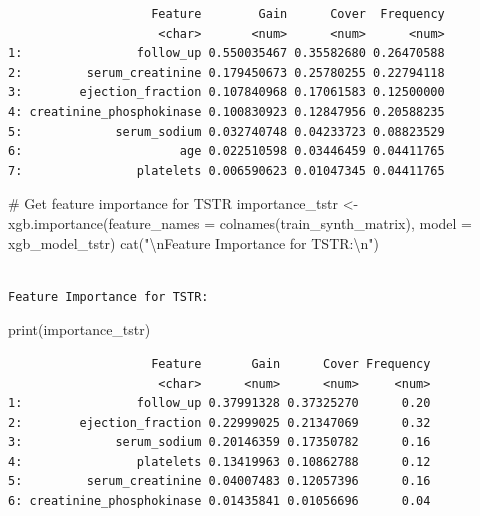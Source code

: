 \documentclass[
  letterpaper,
  DIV=11,
  numbers=noendperiod]{scrartcl}
\newenvironment{Shaded}{\begin{snugshade}}{\end{snugshade}}
\newcommand{\AttributeTok}[1]{\textcolor[rgb]{0.40,0.45,0.13}{#1}}
\newcommand{\CommentTok}[1]{\textcolor[rgb]{0.37,0.37,0.37}{#1}}
\newcommand{\FunctionTok}[1]{\textcolor[rgb]{0.28,0.35,0.67}{#1}}
\newcommand{\NormalTok}[1]{\textcolor[rgb]{0.00,0.23,0.31}{#1}}
\newcommand{\OtherTok}[1]{\textcolor[rgb]{0.00,0.23,0.31}{#1}}
\newcommand{\SpecialCharTok}[1]{\textcolor[rgb]{0.37,0.37,0.37}{#1}}
\newcommand{\StringTok}[1]{\textcolor[rgb]{0.13,0.47,0.30}{#1}}
\begin{document}
\begin{verbatim}
                    Feature        Gain      Cover  Frequency
                     <char>       <num>      <num>      <num>
1:                follow_up 0.550035467 0.35582680 0.26470588
2:         serum_creatinine 0.179450673 0.25780255 0.22794118
3:        ejection_fraction 0.107840968 0.17061583 0.12500000
4: creatinine_phosphokinase 0.100830923 0.12847956 0.20588235
5:             serum_sodium 0.032740748 0.04233723 0.08823529
6:                      age 0.022510598 0.03446459 0.04411765
7:                platelets 0.006590623 0.01047345 0.04411765
\end{verbatim}

\begin{Shaded}
\begin{Highlighting}[]
\CommentTok{\# Get feature importance for TSTR}
\NormalTok{importance\_tstr }\OtherTok{\textless{}{-}} \FunctionTok{xgb.importance}\NormalTok{(}\AttributeTok{feature\_names =} \FunctionTok{colnames}\NormalTok{(train\_synth\_matrix), }\AttributeTok{model =}\NormalTok{ xgb\_model\_tstr)}
\FunctionTok{cat}\NormalTok{(}\StringTok{"}\SpecialCharTok{\textbackslash{}n}\StringTok{Feature Importance for TSTR:}\SpecialCharTok{\textbackslash{}n}\StringTok{"}\NormalTok{)}
\end{Highlighting}
\end{Shaded}

\begin{verbatim}

Feature Importance for TSTR:
\end{verbatim}

\begin{Shaded}
\begin{Highlighting}[]
\FunctionTok{print}\NormalTok{(importance\_tstr)}
\end{Highlighting}
\end{Shaded}

\begin{verbatim}
                    Feature       Gain      Cover Frequency
                     <char>      <num>      <num>     <num>
1:                follow_up 0.37991328 0.37325270      0.20
2:        ejection_fraction 0.22999025 0.21347069      0.32
3:             serum_sodium 0.20146359 0.17350782      0.16
4:                platelets 0.13419963 0.10862788      0.12
5:         serum_creatinine 0.04007483 0.12057396      0.16
6: creatinine_phosphokinase 0.01435841 0.01056696      0.04
\end{verbatim}
\end{document}
